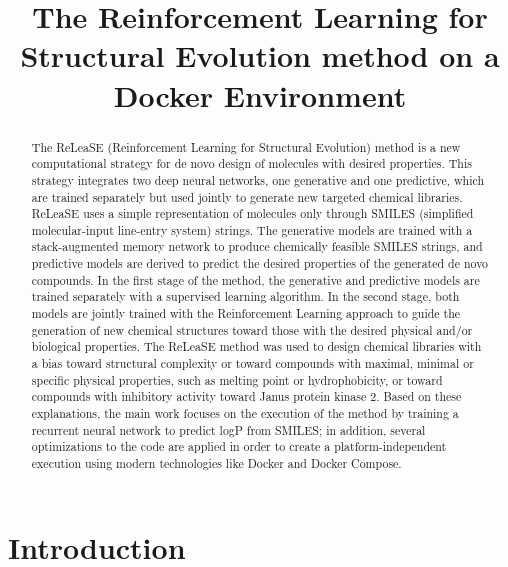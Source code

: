 \documentclass[conference]{IEEEtran}
\begin{document}
\title{The Reinforcement Learning for Structural Evolution method on a Docker Environment}


\author{
}

\maketitle

\begin{abstract}
The ReLeaSE (Reinforcement Learning for Structural Evolution) method is a new computational strategy for de novo design of molecules with desired properties. This strategy integrates two deep neural networks, one generative and one predictive, which are trained separately but used jointly to generate new targeted chemical libraries.
ReLeaSE uses a simple representation of molecules only through SMILES (simplified molecular-input line-entry system) strings.
The generative models are trained with a stack-augmented memory network to produce chemically feasible SMILES strings, and predictive models are derived to predict the desired properties of the generated de novo compounds. In the first stage of the method, the generative and predictive models are trained separately with a supervised learning algorithm. In the second stage, both models are jointly trained with the Reinforcement Learning approach to guide the generation of new chemical structures toward those with the desired physical and/or biological properties.
The ReLeaSE method was used to design chemical libraries with a bias toward structural complexity or toward compounds with maximal, minimal or specific physical properties, such as melting point or hydrophobicity, or toward compounds with inhibitory activity toward Janus protein kinase 2.
Based on these explanations, the main work focuses on the execution of the method by training a recurrent neural network to predict logP from SMILES; in addition, several optimizations to the code are applied in order to create a platform-independent execution using modern technologies like Docker and Docker Compose.

\end{abstract}

\section{Introduction}\label{sec:intro}
\end{document}

